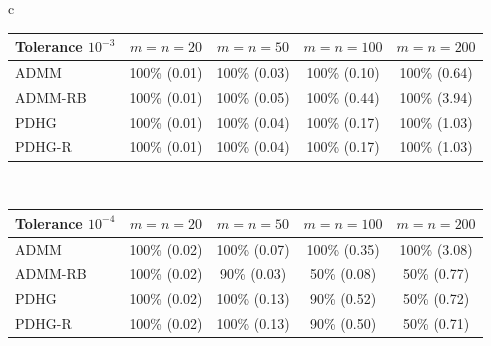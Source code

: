 \begin{tabular}{c}
\begin{tabular}{lcccc}
\toprule
Tolerance $10^{-3}$ & $m=n=20$ & $m=n=50$ & $m=n=100$ & $m=n=200$ \\
\midrule
ADMM & 100\% (0.01) & 100\% (0.03) & 100\% (0.10) & 100\% (0.64) \\
ADMM-RB & 100\% (0.01) & 100\% (0.05) & 100\% (0.44) & 100\% (3.94) \\
PDHG & 100\% (0.01) & 100\% (0.04) & 100\% (0.17) & 100\% (1.03) \\
PDHG-R & 100\% (0.01) & 100\% (0.04) & 100\% (0.17) & 100\% (1.03) \\
\bottomrule
\end{tabular}
\\[1.2ex]
\begin{tabular}{lcccc}
\toprule
Tolerance $10^{-4}$ & $m=n=20$ & $m=n=50$ & $m=n=100$ & $m=n=200$ \\
\midrule
ADMM & 100\% (0.02) & 100\% (0.07) & 100\% (0.35) & 100\% (3.08) \\
ADMM-RB & 100\% (0.02) & 90\% (0.03) & 50\% (0.08) & 50\% (0.77) \\
PDHG & 100\% (0.02) & 100\% (0.13) & 90\% (0.52) & 50\% (0.72) \\
PDHG-R & 100\% (0.02) & 100\% (0.13) & 90\% (0.50) & 50\% (0.71) \\
\bottomrule
\end{tabular}
\end{tabular}